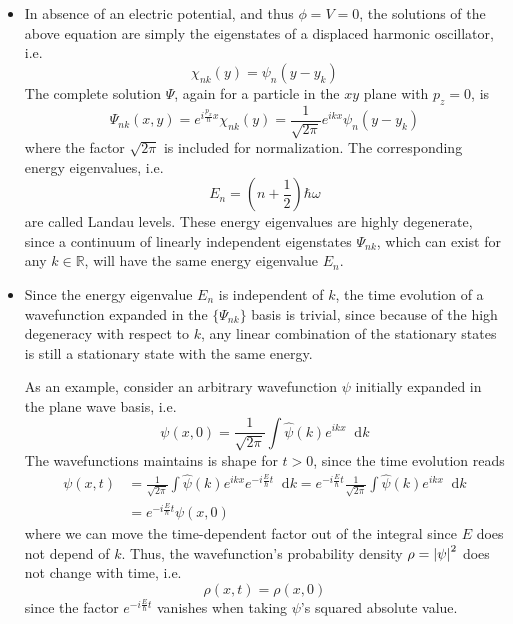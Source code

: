 \documentclass[11pt, a4paper]{article}
\newcommand{\diff}{\mathop{}\!\mathrm{d}} %
\newcommand{\F}[1]{\widehat{#1}} %
\newcommand{\p}{\psi}  %
\renewcommand{\P}{\Psi}  %
\begin{document}
\begin{itemize}
	\item In absence of an electric potential, and thus $ \phi = V = 0 $, the solutions of the above equation are simply the eigenstates of a displaced harmonic oscillator, i.e.
	\begin{equation*}
		\chi_{nk}(y) = \psi_{n}(y - y_{k})
	\end{equation*}
	The complete solution $ \Psi $, again for a particle in the $ xy $ plane with $ p_{z} = 0$, is
	\begin{equation*}
		\P_{nk}(x, y) = e^{i\frac{p_{x}}{\hbar}x}\chi_{nk}(y) = \frac{1}{\sqrt{2\pi}}e^{ikx} \psi_{n}(y - y_{k})
	\end{equation*}
	where the factor $ \sqrt{2\pi} $ is included for normalization. The corresponding energy eigenvalues, i.e.
	\begin{equation*}
		E_{n} = \left(n + \frac{1}{2}\right)\hbar \omega
	\end{equation*}
	are called Landau levels. These energy eigenvalues are highly degenerate, since a continuum of linearly independent eigenstates $ \P_{nk} $, which can exist for any $ k \in \mathbb{R} $, will have the same energy eigenvalue $ E_{n} $. 
	
	\item Since the energy eigenvalue $ E_{n} $ is independent of $ k $, the time evolution of a wavefunction expanded in the $ \{\P_{nk}\} $ basis is trivial, since because of the high degeneracy with respect to $ k $, any linear combination of the stationary states is still a stationary state with the same energy.
	
	As an example, consider an arbitrary wavefunction $ \p $ initially expanded in the plane wave basis, i.e.
	\begin{equation*}
		\p(x, 0) = \frac{1}{\sqrt{2\pi}} \int \F{\p}(k)e^{ikx}\diff k
	\end{equation*}
	The wavefunctions maintains is shape for $ t > 0 $, since the time evolution reads
	\begin{align*}
		\p(x, t) &= \frac{1}{\sqrt{2\pi}} \int \F{\p}(k)e^{ikx}e^{-i\frac{E}{\hbar}t} \diff k = e^{-i\frac{E}{\hbar}t} \frac{1}{\sqrt{2\pi}} \int \F{\p}(k)e^{ikx}\diff k\\
		& = e^{-i\frac{E}{\hbar}t} \p(x, 0)
	\end{align*}
	where we can move the time-dependent factor out of the integral since $ E $ does not depend of $ k $. Thus, the wavefunction's probability density $ \rho = \abs{\p}^{2} $ does not change with time, i.e.
	\begin{equation*}
		\rho(x, t) = \rho(x, 0)
	\end{equation*}
	since the factor $ e^{-i\frac{E}{\hbar}t} $ vanishes when taking $ \p $'s squared absolute value.
	

\end{itemize}
\end{document}
